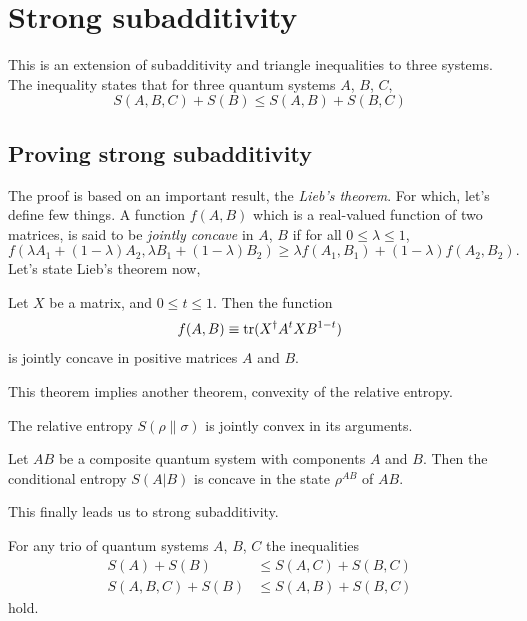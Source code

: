 \section{Strong subadditivity}
This is an extension of subadditivity and triangle inequalities to three systems. The inequality states that for three quantum systems $A$, $B$, $C$,
\begin{equation}
    S(A, B, C) + S(B) \leq S(A, B) + S(B, C)
\end{equation}
\subsection{Proving strong subadditivity}
The proof is based on an important result, the \textit{Lieb's theorem}. For which, let's define few things. A function $f(A, B)$ which is a real-valued function of two matrices, is said to be \textit{jointly concave} in $A$, $B$ if for all $0\leq \lambda \leq 1$,
\begin{equation}
    f(\lambda A_1 + (1-\lambda)A_2, \lambda B_1 + (1-\lambda)B_2) \geq \lambda f(A_1, B_1) + (1-\lambda)f(A_2, B_2).
\end{equation}
Let's state Lieb's theorem now,
\begin{theorem}
    Let $X$ be a matrix, and $0\leq t \leq 1$. Then the function
    \begin{equation}
        f(A, B) \equiv \text{tr}(X^\dag A^tXB^{1-t})
    \end{equation}
    is jointly concave in positive matrices $A$ and $B$.
\end{theorem}
This theorem implies another theorem, convexity of the relative entropy.
\begin{theorem}
    The relative entropy $S(\rho \parallel \sigma)$ is jointly convex in its arguments.
\end{theorem}
\begin{corollary}
    Let $AB$ be a composite quantum system with components $A$ and $B$. Then the conditional entropy $S(A|B)$ is concave in the state $\rho^{AB}$ of $AB$.
\end{corollary}
This finally leads us to strong subadditivity.
\begin{theorem}
    For any trio of quantum systems $A$, $B$, $C$ the inequalities
    \begin{align}
        S(A)+S(B) &\leq S(A,C) + S(B,C) \\
        S(A,B,C) + S(B) &\leq S(A,B) + S(B,C)
    \end{align}
    hold.
\end{theorem}

